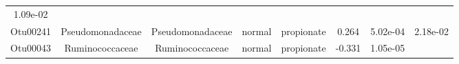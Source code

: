 \documentclass[11pt,]{article}
\begin{document}
\begin{longtable}[]{@{}cccccccc@{}}
\begin{minipage}[t]{0.08\columnwidth}
1.09e-02\strut
\end{minipage}\tabularnewline
\begin{minipage}[t]{0.08\columnwidth}\centering\strut
Otu00241\strut
\end{minipage} & \begin{minipage}[t]{0.15\columnwidth}\centering\strut
Pseudomonadaceae\strut
\end{minipage} & \begin{minipage}[t]{0.15\columnwidth}\centering\strut
Pseudomonadaceae\strut
\end{minipage} & \begin{minipage}[t]{0.08\columnwidth}\centering\strut
normal\strut
\end{minipage} & \begin{minipage}[t]{0.09\columnwidth}\centering\strut
propionate\strut
\end{minipage} & \begin{minipage}[t]{0.07\columnwidth}\centering\strut
0.264\strut
\end{minipage} & \begin{minipage}[t]{0.08\columnwidth}\centering\strut
5.02e-04\strut
\end{minipage} & \begin{minipage}[t]{0.08\columnwidth}\centering\strut
2.18e-02\strut
\end{minipage}\tabularnewline
\begin{minipage}[t]{0.08\columnwidth}\centering\strut
Otu00043\strut
\end{minipage} & \begin{minipage}[t]{0.15\columnwidth}\centering\strut
Ruminococcaceae\strut
\end{minipage} & \begin{minipage}[t]{0.15\columnwidth}\centering\strut
Ruminococcaceae\strut
\end{minipage} & \begin{minipage}[t]{0.08\columnwidth}\centering\strut
normal\strut
\end{minipage} & \begin{minipage}[t]{0.09\columnwidth}\centering\strut
propionate\strut
\end{minipage} & \begin{minipage}[t]{0.07\columnwidth}\centering\strut
-0.331\strut
\end{minipage} & \begin{minipage}[t]{0.08\columnwidth}\centering\strut
1.05e-05\strut
\end{minipage} & \begin{minipage}[t]{0.08\columnwidth}\centering\strut

\end{minipage}
\end{longtable}
\end{document}
